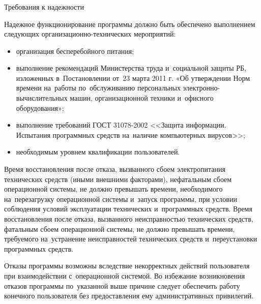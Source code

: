 \subsubsection{} Требования к надежности
\label{sec:analysis:research:req:reliability}

Надежное функционирование программы должно быть обеспечено выполнением следующих организационно-технических мероприятий:

\begin{itemize}
	\item организация бесперебойного питания;
	\item выполнение рекомендаций Министерства труда и~социальной защиты РБ, изложенных в~Постановлении от~23 марта 2011 г. «Об утверждении Норм времени на~работы по~обслуживанию персональных электронно-вычислитель\-ных машин, организационной техники и~офисного оборудования»;
	\item выполнение требований ГОСТ 31078-2002 <<Защита информации. Испытания программных средств на~наличие компьютерных вирусов>>;
	\item необходимым уровнем квалификации пользователей.
\end{itemize}

Время восстановления после отказа, вызванного сбоем электропитания технических средств (иными внешними факторами), нефатальным сбоем операционной системы, не должно превышать времени, необходимого на~перезагрузку операционной системы и~запуск программы, при условии соблюдения условий эксплуатации технических и~программных средств. Время восстановления после отказа, вызванного неисправностью технических средств, фатальным сбоем операционной системы, не должно превышать времени, требуемого на~устранение неисправностей технических средств и~переустановки программных средств.

Отказы программы возможны вследствие некорректных действий пользователя при взаимодействии с~операционной системой. Во избежание возникновения отказов программы по~указанной выше причине следует обеспечить работу конечного пользователя без предоставления ему административных привилегий.